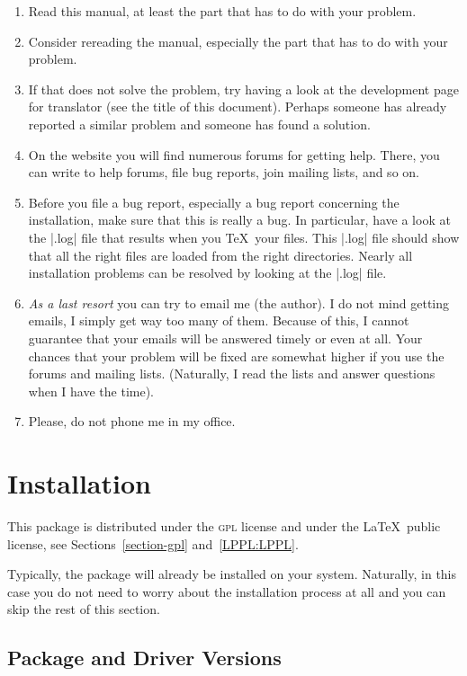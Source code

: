 \documentclass{ltxdoc}
\begin{document}
\begin{enumerate}
\item
  Read this manual, at least the part that has to do with your
  problem.
\item
  Consider rereading the manual, especially the part that has to do
  with your problem.
\item
  If that does not solve the problem, try having a look at the
  development page for translator (see the
  title of this document). Perhaps someone has already reported a
  similar problem and someone has found a solution.
\item
  On the website you will find numerous forums for getting
  help. There, you can write to help forums, file bug reports, join
  mailing lists, and so on.
\item
  Before you file a bug report, especially a bug report concerning the
  installation, make sure that this is really a bug. In particular,
  have a look at the |.log| file that results when you \TeX\ your
  files. This |.log| file should show that all the right files are
  loaded from the right directories. Nearly all installation problems
  can be resolved by looking at the |.log| file.
\item
  \emph{As a last resort} you can try to email me (the author). I do
  not mind getting emails, I simply get way too many of them. Because
  of this, I cannot guarantee that your emails will be answered timely
  or even at all. Your chances that your problem will be fixed are
  somewhat higher if you use the forums and mailing lists. (Naturally,
  I read the lists and answer questions when I have the time).
\item
  Please, do not phone me in my office. 
\end{enumerate}




\section{Installation}

This package is distributed under the \textsc{gpl} license and under
the \LaTeX\ public license, see Sections~\ref{section-gpl}
and~\ref{LPPL:LPPL}. 

Typically, the package will already be installed on your
system. Naturally, in this case you do not need to worry about the
installation process at all and you can skip the rest of this
section. 



\subsection{Package and Driver Versions}
\end{document}
